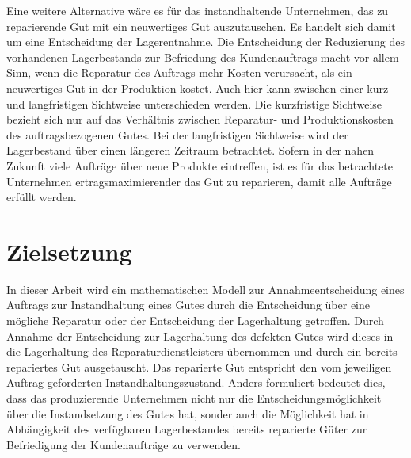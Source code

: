 Eine weitere Alternative wäre es für das instandhaltende Unternehmen, das zu reparierende Gut mit ein neuwertiges Gut auszutauschen. Es handelt sich damit um eine Entscheidung der Lagerentnahme. Die Entscheidung der Reduzierung des vorhandenen Lagerbestands zur Befriedung des Kundenauftrags macht vor allem Sinn, wenn die Reparatur des Auftrags mehr Kosten verursacht, als ein neuwertiges Gut in der Produktion kostet. Auch hier kann zwischen einer kurz- und langfristigen Sichtweise unterschieden werden. Die kurzfristige Sichtweise bezieht sich nur auf das Verhältnis zwischen Reparatur- und Produktionskosten des auftragsbezogenen Gutes. Bei der langfristigen Sichtweise wird der Lagerbestand über einen längeren Zeitraum betrachtet. Sofern in der nahen Zukunft viele Aufträge über neue Produkte eintreffen, ist es für das betrachtete Unternehmen ertragsmaximierender das Gut zu reparieren, damit alle Aufträge erfüllt werden.




\section{Zielsetzung}

In dieser Arbeit wird ein mathematischen Modell zur Annahmeentscheidung eines Auftrags zur Instandhaltung eines Gutes durch die Entscheidung über eine mögliche Reparatur oder der Entscheidung der Lagerhaltung getroffen. Durch Annahme der Entscheidung zur Lagerhaltung des defekten Gutes wird dieses in die Lagerhaltung des Reparaturdienstleisters übernommen und durch ein bereits repariertes Gut ausgetauscht. Das reparierte Gut entspricht den vom jeweiligen Auftrag geforderten Instandhaltungszustand. Anders formuliert bedeutet dies, dass das produzierende Unternehmen nicht nur die Entscheidungsmöglichkeit über die Instandsetzung des Gutes hat, sonder auch die Möglichkeit hat in Abhängigkeit des verfügbaren Lagerbestandes bereits reparierte Güter zur Befriedigung der Kundenaufträge zu verwenden.

